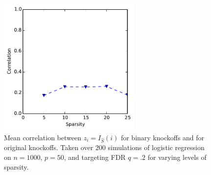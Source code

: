 \documentclass[11pt]{article}
\theoremstyle{definition}
\begin{document}
    \begin{figure}[h]
        \begin{center}
        \includegraphics[width=7cm]{images/logit_corr_50}
    \end{center}
    \caption{\linespread{1}\selectfont{}Mean correlation between $z_i=I_{\hat S}(i)$ for binary knockoffs and for original knockoffs. Taken over $200$ simulations of logistic regression on $n=1000$, $p=50$, and targeting FDR $q=.2$ for varying levels of sparsity.}  
    \end{figure}

    \FloatBarrier
\end{document}
